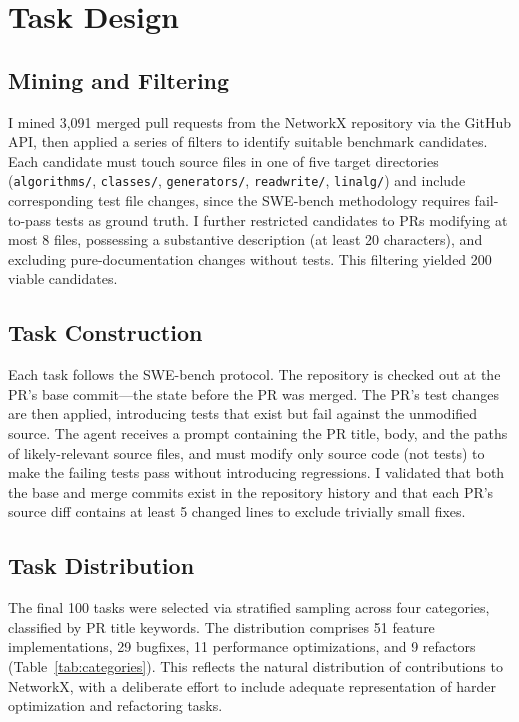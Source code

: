 \documentclass[10pt]{article}
\begin{document}
\section{Task Design}

\subsection{Mining and Filtering}

I mined 3,091 merged pull requests from the NetworkX repository via the GitHub API, then applied a series of filters to identify suitable benchmark candidates. Each candidate must touch source files in one of five target directories (\texttt{algorithms/}, \texttt{classes/}, \texttt{generators/}, \texttt{readwrite/}, \texttt{linalg/}) and include corresponding test file changes, since the SWE-bench methodology requires fail-to-pass tests as ground truth. I further restricted candidates to PRs modifying at most 8 files, possessing a substantive description (at least 20 characters), and excluding pure-documentation changes without tests. This filtering yielded 200 viable candidates.

\subsection{Task Construction}

Each task follows the SWE-bench protocol. The repository is checked out at the PR's base commit---the state before the PR was merged. The PR's test changes are then applied, introducing tests that exist but fail against the unmodified source. The agent receives a prompt containing the PR title, body, and the paths of likely-relevant source files, and must modify only source code (not tests) to make the failing tests pass without introducing regressions. I validated that both the base and merge commits exist in the repository history and that each PR's source diff contains at least 5 changed lines to exclude trivially small fixes.

\subsection{Task Distribution}

The final 100 tasks were selected via stratified sampling across four categories, classified by PR title keywords. The distribution comprises 51 feature implementations, 29 bugfixes, 11 performance optimizations, and 9 refactors (Table~\ref{tab:categories}). This reflects the natural distribution of contributions to NetworkX, with a deliberate effort to include adequate representation of harder optimization and refactoring tasks.
\end{document}
